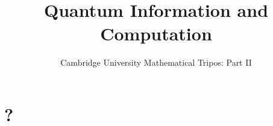 \documentclass{article}
\title{Quantum Information and Computation}
\author{Cambridge University Mathematical Tripos: Part II}
\begin{document}
\maketitle

\tableofcontentsnewpage{}

\section{?}

\end{document}
